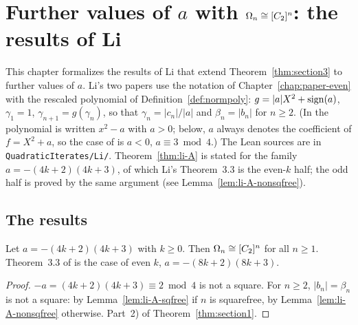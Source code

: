\chapter{\texorpdfstring{Further values of $a$ with $\Omega_n \cong [C_2]^{n}$: the results of Li}{Further
  values of a with the full wreath power: the results of Li}}
\label{chap:li}

This chapter formalizes the results of Li \cite{li2020, li2021} that extend
Theorem~\ref{thm:section3} to further values of $a$. Li's two papers use the notation of
Chapter~\ref{chap:paper-even} with the rescaled polynomial of Definition~\ref{def:normpoly}:
$g = |a| X^2 + \operatorname{sign}(a)$, $\gamma_1 = 1$, $\gamma_{n+1} = g(\gamma_n)$, so that
$\gamma_n = |c_n|/|a|$ and $\beta_n = |b_n|$ for $n \ge 2$. (In \cite{li2020} the polynomial is
written $x^2 - a$ with $a > 0$; below, $a$ always denotes the coefficient of $f = X^2 + a$, so the
case of \cite{li2020} is $a < 0$, $a \equiv 3 \bmod 4$.) The Lean sources are in
\texttt{QuadraticIterates/Li/}. Theorem~\ref{thm:li-A} is stated for the family
$a = -(4k+2)(4k+3)$, of which Li's Theorem~3.3 is the even-$k$ half; the odd half is proved by
the same argument (see Lemma~\ref{lem:li-A-nonsqfree}).

\section{The results}

\begin{theorem}
  \label{thm:li-A}
  \leanok
  Let $a = -(4k+2)(4k+3)$ with $k \ge 0$. Then $\Omega_n \cong [C_2]^{n}$ for all $n \ge 1$.
  Theorem~3.3 of \cite{li2021} is the case of even $k$, $a = -(8k+2)(8k+3)$.
\end{theorem}
\begin{proof}
  \leanok
  $-a = (4k+2)(4k+3) \equiv 2 \bmod 4$ is not a square. For $n \ge 2$, $|b_n| = \beta_n$ is not a
  square: by Lemma~\ref{lem:li-A-sqfree} if $n$ is squarefree, by
  Lemma~\ref{lem:li-A-nonsqfree} otherwise. Part~2) of Theorem~\ref{thm:section1}.
\end{proof}

